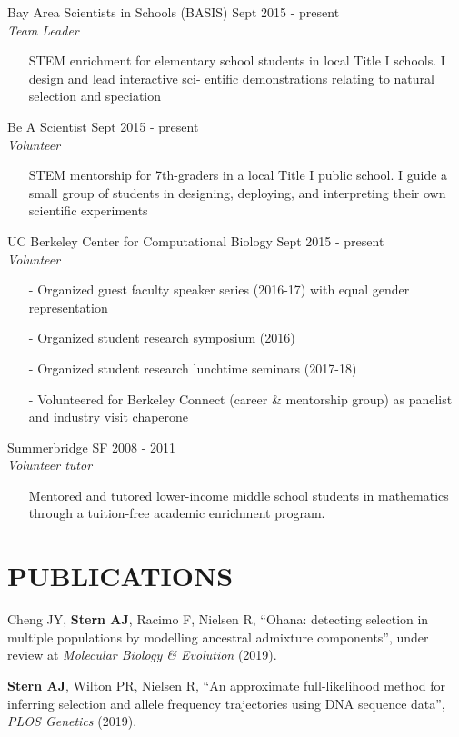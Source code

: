 \documentclass[margin, 10pt]{res} %
\begin{document}
\begin{resume}
Bay Area Scientists in Schools (BASIS) \hfill Sept 2015 - present\\
{\sl Team Leader}
\begin{itemize}
\item[] STEM enrichment for elementary school students in local Title I schools. I design and lead interactive sci- entific demonstrations relating to natural selection and speciation
\end{itemize} 
Be A Scientist \hfill Sept 2015 - present\\
{\sl Volunteer}
\begin{itemize}
\item[] STEM mentorship for 7th-graders in a local Title I public school. I guide a small group of students in designing, deploying, and interpreting their own scientific experiments
\end{itemize} 
UC Berkeley Center for Computational Biology \hfill Sept 2015 - present\\
{\sl Volunteer}
\begin{itemize}
\item[-] Organized guest faculty speaker series (2016-17) with equal gender representation
\item[-] Organized student research symposium (2016)
\item[-] Organized student research lunchtime seminars (2017-18)
\item[-] Volunteered for Berkeley Connect (career \& mentorship group) as panelist and industry visit chaperone
\end{itemize}
Summerbridge SF \hfill 2008 - 2011\\
{\sl Volunteer tutor}
\begin{itemize}
\item[] Mentored and tutored lower-income middle school students in mathematics through a tuition-free academic enrichment program.
\end{itemize}

\section{PUBLICATIONS}

Cheng JY, {\bf Stern AJ}, Racimo F, Nielsen R, ``Ohana: detecting selection in multiple populations by
modelling ancestral admixture components'', under review at {\it Molecular Biology \& Evolution} (2019).

{\bf Stern AJ}, Wilton PR, Nielsen R, ``An approximate full-likelihood method for inferring selection and allele frequency trajectories using DNA sequence data'', {\it PLOS Genetics} (2019).


\end{resume}
\end{document}
